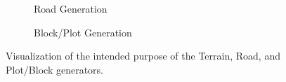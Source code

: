 \begin{center}
\begin{figure}[H]
\begin{subfigure}[b]{0.32\textwidth}
      \caption{Road Generation}
      \label{fig:generatorexamples2}
    \end{subfigure}
    \begin{subfigure}[b]{0.32\textwidth}
      \caption{Block/Plot Generation}
      \label{fig:generatorexamples3}
    \end{subfigure}
    \caption{Visualization of the intended purpose of the Terrain, Road, and Plot/Block generators.}
    \label{fig:generatorexamples}
  \end{figure}
\end{center}
  







